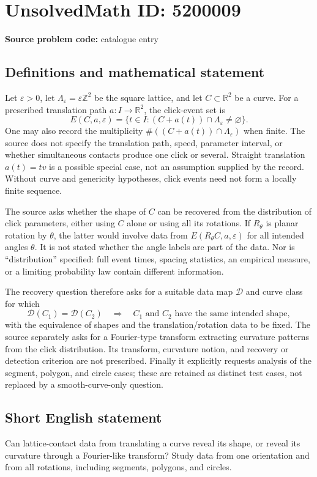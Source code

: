 \documentclass[11pt]{article}
\newcommand{\Z}{\mathbb{Z}}
\newcommand{\R}{\mathbb{R}}
\begin{document}
\section*{UnsolvedMath ID: 5200009}
\textbf{Source problem code:} catalogue entry
\subsection{Definitions and mathematical statement}
Let $\varepsilon>0$, let $\Lambda_\varepsilon=\varepsilon\Z^2$ be the square lattice, and let $C\subset\R^2$ be a curve. For a prescribed translation path $a:I\to\R^2$, the click-event set is
\[
 E(C,a,\varepsilon)=\{t\in I:(C+a(t))\cap\Lambda_\varepsilon\ne\varnothing\}.
\]
One may also record the multiplicity $\#((C+a(t))\cap\Lambda_\varepsilon)$ when finite. The source does not specify the translation path, speed, parameter interval, or whether simultaneous contacts produce one click or several. Straight translation $a(t)=tv$ is a possible special case, not an assumption supplied by the record. Without curve and genericity hypotheses, click events need not form a locally finite sequence.

The source asks whether the shape of $C$ can be recovered from the distribution of click parameters, either using $C$ alone or using all its rotations. If $R_\theta$ is planar rotation by $\theta$, the latter would involve data from $E(R_\theta C,a,\varepsilon)$ for all intended angles $\theta$. It is not stated whether the angle labels are part of the data. Nor is ``distribution'' specified: full event times, spacing statistics, an empirical measure, or a limiting probability law contain different information.

The recovery question therefore asks for a suitable data map $\mathcal D$ and curve class for which
\[
 \mathcal D(C_1)=\mathcal D(C_2)
 \quad\Longrightarrow\quad
 C_1\text{ and }C_2\text{ have the same intended shape},
\]
with the equivalence of shapes and the translation/rotation data to be fixed. The source separately asks for a Fourier-type transform extracting curvature patterns from the click distribution. Its transform, curvature notion, and recovery or detection criterion are not prescribed. Finally it explicitly requests analysis of the segment, polygon, and circle cases; these are retained as distinct test cases, not replaced by a smooth-curve-only question.
\subsection{Short English statement}
Can lattice-contact data from translating a curve reveal its shape, or reveal its curvature through a Fourier-like transform? Study data from one orientation and from all rotations, including segments, polygons, and circles.
\end{document}
